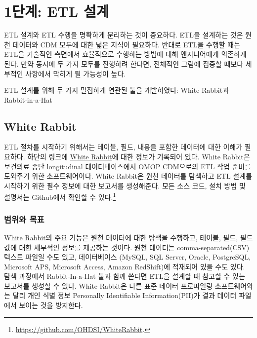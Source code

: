 \documentclass[10.5pt]{book}
\let\rmarkdownfootnote\footnote%
\def\footnote{\protect\rmarkdownfootnote}
\theoremstyle{definition}
\theoremstyle{definition}
\theoremstyle{definition}
\theoremstyle{remark}
\begin{document}
\section{1단계: ETL 설계}\label{-etl-}

ETL 설계와 ETL 수행을 명확하게 분리하는 것이 중요하다. ETL을 설계하는
것은 원천 데이터와 CDM 모두에 대한 넓은 지식이 필요하다. 반대로 ETL을
수행할 때는 ETL을 기술적인 측면에서 효율적으로 수행하는 방법에 대해
엔지니어에게 의존하게 된다. 만약 동시에 두 가지 모두를 진행하려 한다면,
전체적인 그림에 집중할 때보다 세부적인 사항에서 막히게 될 가능성이 높다.

ETL 설계를 위해 두 가지 밀접하게 연관된 툴을 개발하였다: White Rabbit과
Rabbit-in-a-Hat

\subsection{White Rabbit}\label{white-rabbit}

ETL 절차를 시작하기 위해서는 테이블, 필드, 내용을 포함한 데이터에 대한
이해가 필요하다. 하단의 링크에
\href{https://github.com/OHDSI/WhiteRabbit}{White Rabbit}에 대한 정보가
기록되어 있다. White Rabbit은 보건의료 종단 longitudinal
데이터베이스에서 \href{https://github.com/OHDSI/CommonDataModel}{OMOP
CDM}으로의 ETL 작업 준비를 도와주기 위한 소프트웨어이다. White Rabbit은
원천 데이터를 탐색하고 ETL 설계를 시작하기 위한 필수 정보에 대한
보고서를 생성해준다. 모든 소스 코드, 설치 방법 및 설명서는 Github에서
확인할 수 있다.\footnote{\url{https://github.com/OHDSI/WhiteRabbit}.}
 

\subsubsection*{범위와 목표}\label{-}

White Rabbit의 주요 기능은 원천 데이터에 대한 탐색을 수행하고, 테이블,
필드, 필드 값에 대한 세부적인 정보를 제공하는 것이다. 원천 데이터는
comma-separated(CSV) 텍스트 파일일 수도 있고, 데이터베이스 (MySQL, SQL
Server, Oracle, PostgreSQL, Microsoft APS, Microsoft Access, Amazon
RedShift)에 적재되어 있을 수도 있다. 탐색 과정에서 Rabbit-In-a-Hat 툴과
함께 쓴다면 ETL을 설계할 때 참고할 수 있는 보고서를 생성할 수 있다.
White Rabbit은 다른 표준 데이터 프로파일링 소프트웨어와는 달리 개인 식별
정보 Personally Identifiable Information(PII)가 결과 데이터 파일에서
보이는 것을 방지한다.
\end{document}
